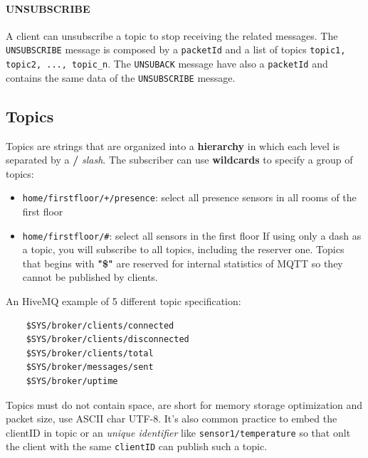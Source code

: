 \documentclass[10pt,a4paper]{report}
\theoremstyle{definition}
\begin{document}
\paragraph{UNSUBSCRIBE}\label{sec:unsubscribe}
A client can unsubscribe a topic to stop receiving the related messages. The \texttt{UNSUBSCRIBE} message is composed by a \texttt{packetId} and a list of topics \texttt{topic1, topic2, ..., topic\_n}. 
The \texttt{UNSUBACK} message have also a \texttt{packetId} and contains the same data of the \texttt{UNSUBSCRIBE} message.

\subsection{Topics}\label{sec:topics}
Topics are strings that are organized into a \textbf{hierarchy} in which each level is separated by a \textbf{/} \textit{slash}.
The subscriber can use \textbf{wildcards} to specify a group of topics:
\begin{itemize}
	\item 
	\texttt{home/firstfloor/+/presence}: select all presence sensors in all rooms of the first floor
	\item 
	\texttt{home/firstfloor/\#}: select all sensors in the first floor
	If using only a dash as a topic, you will subscribe to all topics, including the reserver one.
	Topics that begins with \textbf{"\$"} are reserved for internal statistics of MQTT so they cannot be published by clients. 
\end{itemize}
An HiveMQ example of 5 different topic specification:
\begin{verbatim}
	$SYS/broker/clients/connected 
	$SYS/broker/clients/disconnected 
	$SYS/broker/clients/total 
	$SYS/broker/messages/sent 
	$SYS/broker/uptime
\end{verbatim}

Topics must do not contain space, are short for memory storage optimization and packet size, use ASCII char UTF-8. It's also common practice to embed the clientID in topic or an \textit{unique identifier} like \texttt{sensor1/temperature} so that onlt the client with the same \texttt{clientID} can publish such a topic.
\end{document}
